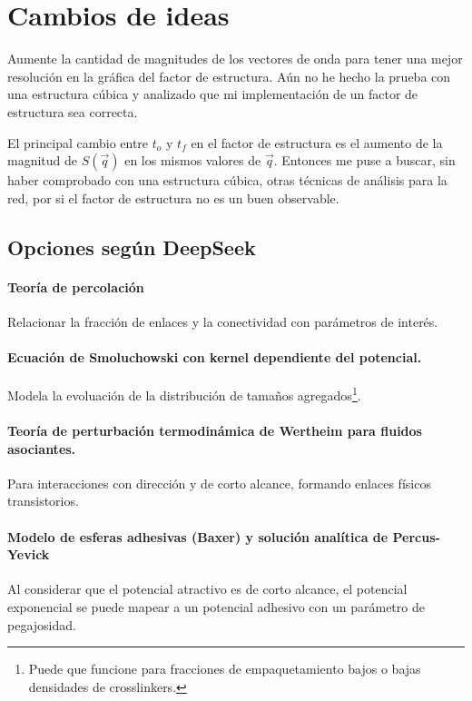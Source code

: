 \documentclass[../main.tex]{subfiles}
\begin{document}
\section{Cambios de ideas}

Aumente la cantidad de magnitudes de los vectores de onda para tener una mejor resolución en la gráfica del factor de estructura.
Aún no he hecho la prueba con una estructura cúbica y analizado que mi implementación de un factor de estructura sea correcta.

El principal cambio entre \(t_{o}\) y \(t_{f}\) en el factor de estructura es el aumento de la magnitud de \(S(\vec{q})\) en los mismos valores de \(\vec{q}\).
Entonces me puse a buscar, sin haber comprobado con una estructura cúbica, otras técnicas de análisis para la red, por si el factor de estructura no es un buen observable.

\subsection{Opciones según DeepSeek}

\paragraph{Teoría de percolación}
Relacionar la fracción de enlaces y la conectividad con parámetros de interés.

\paragraph{Ecuación de Smoluchowski con kernel dependiente del potencial.}
Modela la evoluación de la distribución de tamaños agregados\footnote{Puede que funcione para fracciones de empaquetamiento bajos o bajas densidades de crosslinkers.}.

\paragraph{Teoría de perturbación termodinámica de Wertheim para fluidos asociantes.}
Para interacciones con dirección y de corto alcance, formando enlaces físicos transistorios.

\paragraph{Modelo de esferas adhesivas (Baxer) y solución analítica de Percus-Yevick}
Al considerar que el potencial atractivo es de corto alcance, el potencial exponencial se puede mapear a un potencial adhesivo con un parámetro de pegajosidad.
\end{document}
